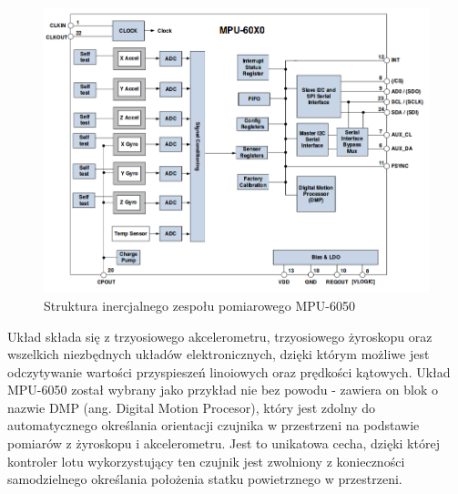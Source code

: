 \begin{figure}[H]
	\centering
	\includegraphics[scale=0.5]{Pictures/IMU.png}
        \caption[Struktura inercjalnego zespołu pomiarowego]{Struktura inercjalnego zespołu pomiarowego MPU-6050}
        \label{fig:IMU}
\end{figure}

Układ składa się z trzyosiowego akcelerometru, trzyosiowego żyroskopu oraz wszelkich niezbędnych układów elektronicznych, dzięki którym możliwe jest odczytywanie wartości przyspieszeń linoiowych oraz prędkości kątowych. Układ MPU-6050 został wybrany jako przykład nie bez powodu - zawiera on blok o nazwie DMP (ang. Digital Motion Procesor), który jest zdolny do automatycznego określania orientacji czujnika w przestrzeni na podstawie pomiarów z żyroskopu i akcelerometru. Jest to unikatowa cecha, dzięki której kontroler lotu wykorzystujący ten czujnik jest zwolniony z konieczności samodzielnego określania  położenia statku powietrznego w przestrzeni. 
